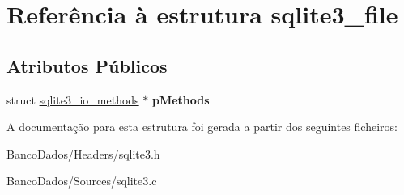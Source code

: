 \hypertarget{structsqlite3__file}{\section{Referência à estrutura sqlite3\-\_\-file}
\label{structsqlite3__file}
}
\subsection*{Atributos Públicos}
\begin{DoxyCompactItemize}
\item 
\hypertarget{structsqlite3__file_afb7c7beec15f0867d22f5260fcee24d3}{struct \hyperlink{structsqlite3__io__methods}{sqlite3\-\_\-io\-\_\-methods} $\ast$ {\bfseries p\-Methods}}\label{structsqlite3__file_afb7c7beec15f0867d22f5260fcee24d3}

\end{DoxyCompactItemize}


A documentação para esta estrutura foi gerada a partir dos seguintes ficheiros\-:\begin{DoxyCompactItemize}
\item 
Banco\-Dados/\-Headers/sqlite3.\-h\item 
Banco\-Dados/\-Sources/sqlite3.\-c\end{DoxyCompactItemize}
